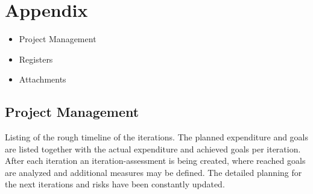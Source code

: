 \chapter{Appendix}
	\begin{itemize}
		\item Project Management
		\item Registers
		\item Attachments
	\end{itemize}

	\section{Project Management}
		Listing of the rough timeline of the iterations. The planned expenditure and goals are listed together with the actual expenditure and achieved goals per iteration. After each iteration an iteration-assessment is being created, where reached goals are analyzed and additional measures may be defined. The detailed planning for the next iterations and risks have been constantly updated.

